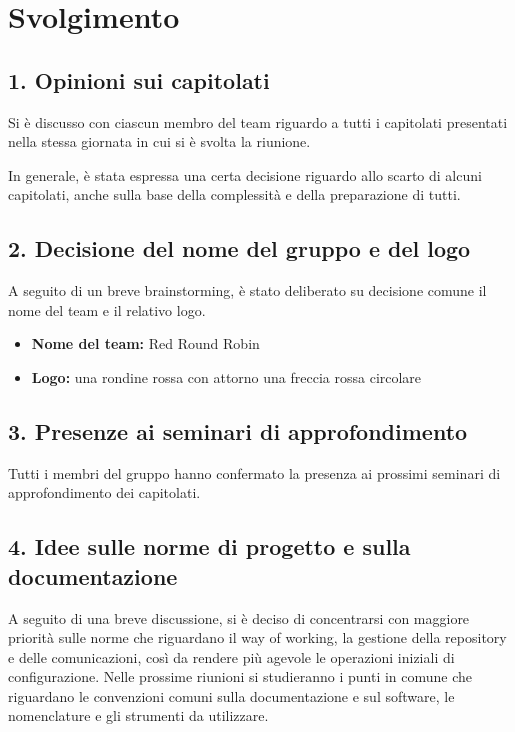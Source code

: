 \newpage
\section*{Svolgimento}

\subsection*{1. Opinioni sui capitolati}

Si è discusso con ciascun membro del team riguardo a tutti i capitolati presentati nella stessa giornata in cui si è svolta la riunione. 

In generale, è stata espressa una certa decisione riguardo allo scarto di alcuni capitolati, anche sulla base della complessità e della preparazione di tutti.

\subsection*{2. Decisione del nome del gruppo e del logo}

A seguito di un breve brainstorming, è stato deliberato su decisione comune il nome del team e il relativo logo.

\begin{itemize}
	\item \textbf{Nome del team:} Red Round Robin
	\item \textbf{Logo:} una rondine rossa con attorno una freccia rossa circolare
\end{itemize}

\subsection*{3. Presenze ai seminari di approfondimento}

Tutti i membri del gruppo hanno confermato la presenza ai prossimi seminari di approfondimento dei capitolati.

\subsection*{4. Idee sulle norme di progetto e sulla documentazione}

A seguito di una breve discussione, si è deciso di concentrarsi con maggiore priorità sulle norme che riguardano il way of working, la gestione della repository e delle comunicazioni, così da rendere più agevole le operazioni iniziali di configurazione.
Nelle prossime riunioni si studieranno i punti in comune che riguardano le convenzioni comuni sulla documentazione e sul software, le nomenclature e gli strumenti da utilizzare. 

